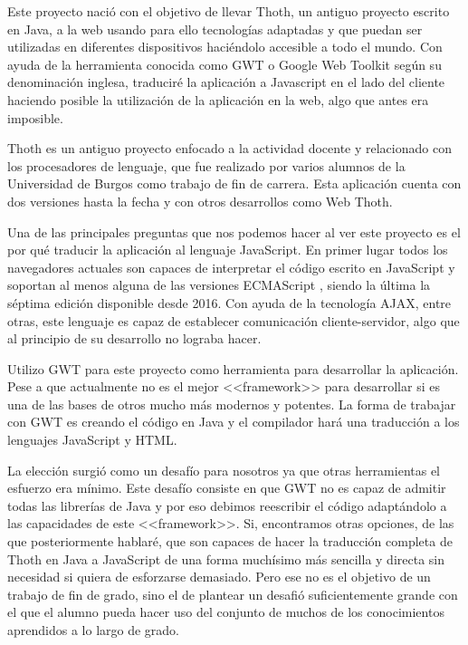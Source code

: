
Este proyecto nació con el objetivo de llevar Thoth, un antiguo proyecto escrito en Java, a la web usando para ello tecnologías adaptadas y que puedan ser utilizadas en diferentes dispositivos haciéndolo accesible a todo el mundo. Con ayuda de la herramienta conocida como GWT o Google Web Toolkit según su denominación inglesa, traduciré la aplicación a Javascript en el lado del cliente haciendo posible la utilización de la aplicación en la web, algo que antes era imposible.

Thoth \cite{garcia2007ensenanza}
 es un antiguo proyecto enfocado a la actividad docente y relacionado con los procesadores de lenguaje, que fue realizado por varios alumnos de la Universidad de Burgos como trabajo de fin de carrera. Esta aplicación cuenta con dos versiones  hasta la fecha y con otros desarrollos como Web Thoth.

Una de las principales preguntas que nos podemos hacer al ver este proyecto es el por qué traducir la aplicación al lenguaje JavaScript. 
En primer lugar todos los navegadores actuales son capaces de interpretar el código escrito en JavaScript y soportan al menos alguna de las versiones ECMAScript \cite{ecma:versiones}, siendo la última la séptima edición disponible desde 2016. Con ayuda de la tecnología AJAX, entre otras, este lenguaje es capaz de establecer comunicación cliente-servidor, algo que al principio de su desarrollo no lograba hacer. 

Utilizo GWT para este proyecto como herramienta para desarrollar la aplicación. Pese a que actualmente no es el mejor <<framework>> para desarrollar si es una de las bases de otros mucho más modernos y potentes. La forma de trabajar con GWT es creando el código en Java y el compilador hará una traducción a los lenguajes JavaScript y HTML.

La elección surgió como un desafío para nosotros ya que otras herramientas el esfuerzo era mínimo. Este desafío consiste en que GWT no es capaz de admitir todas las librerías de Java y por eso debimos reescribir el código adaptándolo a las capacidades de este <<framework>>. Si, encontramos otras opciones, de las que posteriormente hablaré, que son capaces de hacer la traducción completa de Thoth en Java a JavaScript de una forma muchísimo más sencilla y directa sin necesidad si quiera de esforzarse demasiado. Pero ese no es el objetivo de un trabajo de fin de grado, sino el de plantear un desafió suficientemente grande con el que el alumno pueda hacer uso del conjunto de muchos de los conocimientos aprendidos a lo largo de grado.